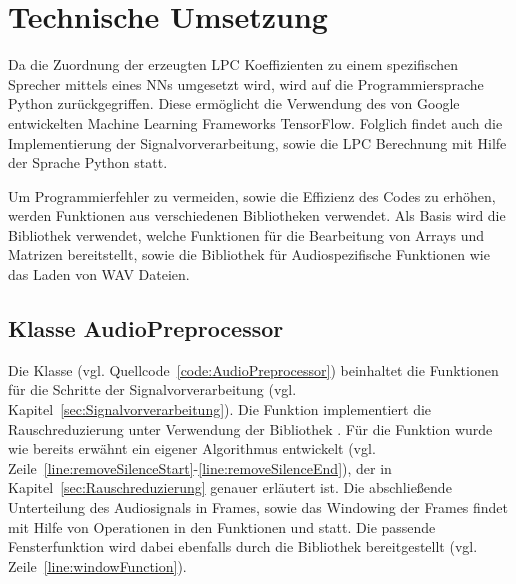 \section{Technische Umsetzung}\label{sec:TechnischeUmsetzung}
Da die Zuordnung der erzeugten \ac{LPC} Koeffizienten zu einem spezifischen Sprecher mittels eines \acp{NN} umgesetzt wird, wird auf die Programmiersprache Python zurückgegriffen.
Diese ermöglicht die Verwendung des von Google entwickelten Machine Learning Frameworks TensorFlow.
Folglich findet auch die Implementierung der Signalvorverarbeitung, sowie die \ac{LPC} Berechnung mit Hilfe der Sprache Python statt.

Um Programmierfehler zu vermeiden, sowie die Effizienz des Codes zu erhöhen, werden Funktionen aus verschiedenen Bibliotheken verwendet.
Als Basis wird die Bibliothek  verwendet, welche Funktionen für die Bearbeitung von Arrays und Matrizen bereitstellt, sowie die Bibliothek  für Audiospezifische Funktionen wie das Laden von WAV Dateien.

\subsection{Klasse AudioPreprocessor}
Die Klasse  (vgl. Quellcode~\ref{code:AudioPreprocessor}) beinhaltet die Funktionen für die Schritte der Signalvorverarbeitung (vgl. Kapitel~\ref{sec:Signalvorverarbeitung}).
Die Funktion  implementiert die Rauschreduzierung unter Verwendung der Bibliothek .
Für die Funktion  wurde wie bereits erwähnt ein eigener Algorithmus entwickelt (vgl. Zeile~\ref{line:removeSilenceStart}-\ref{line:removeSilenceEnd}), der in Kapitel~\ref{sec:Rauschreduzierung} genauer erläutert ist.
Die abschließende Unterteilung des Audiosignals in Frames, sowie das Windowing der Frames findet mit Hilfe von  Operationen in den Funktionen  und  statt.
Die passende Fensterfunktion wird dabei ebenfalls durch die   Bibliothek bereitgestellt (vgl. Zeile~\ref{line:windowFunction}).

